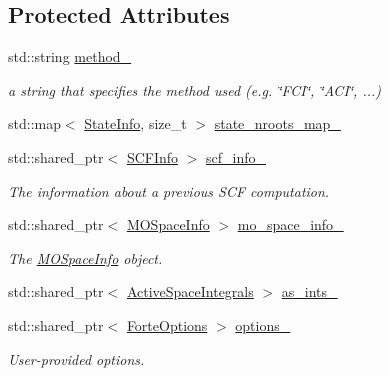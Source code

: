 \subsection*{Protected Attributes}
\begin{DoxyCompactItemize}
\item 
std\+::string \mbox{\hyperlink{classforte_1_1_active_space_solver_a7d69532c3bb03e0dc39a0b5b8c633544}{method\+\_\+}}
\begin{DoxyCompactList}\small\item\em a string that specifies the method used (e.\+g. \char`\"{}\+F\+C\+I\char`\"{}, \char`\"{}\+A\+C\+I\char`\"{}, ...) \end{DoxyCompactList}\item 
std\+::map$<$ \mbox{\hyperlink{classforte_1_1_state_info}{State\+Info}}, size\+\_\+t $>$ \mbox{\hyperlink{classforte_1_1_active_space_solver_ad97b0a6e07f38da9e7f32632bdec95bb}{state\+\_\+nroots\+\_\+map\+\_\+}}
\item 
std\+::shared\+\_\+ptr$<$ \mbox{\hyperlink{classforte_1_1_s_c_f_info}{S\+C\+F\+Info}} $>$ \mbox{\hyperlink{classforte_1_1_active_space_solver_a03edab09e020e472b311be5401d9ebad}{scf\+\_\+info\+\_\+}}
\begin{DoxyCompactList}\small\item\em The information about a previous S\+CF computation. \end{DoxyCompactList}\item 
std\+::shared\+\_\+ptr$<$ \mbox{\hyperlink{classforte_1_1_m_o_space_info}{M\+O\+Space\+Info}} $>$ \mbox{\hyperlink{classforte_1_1_active_space_solver_a32a700889f190e3114786cee58255f27}{mo\+\_\+space\+\_\+info\+\_\+}}
\begin{DoxyCompactList}\small\item\em The \mbox{\hyperlink{classforte_1_1_m_o_space_info}{M\+O\+Space\+Info}} object. \end{DoxyCompactList}\item 
std\+::shared\+\_\+ptr$<$ \mbox{\hyperlink{classforte_1_1_active_space_integrals}{Active\+Space\+Integrals}} $>$ \mbox{\hyperlink{classforte_1_1_active_space_solver_a0af4d2dcbe729958cc0526436534b61e}{as\+\_\+ints\+\_\+}}
\item 
std\+::shared\+\_\+ptr$<$ \mbox{\hyperlink{classforte_1_1_forte_options}{Forte\+Options}} $>$ \mbox{\hyperlink{classforte_1_1_active_space_solver_a2916126e2403a6955fa6f76f13285232}{options\+\_\+}}
\begin{DoxyCompactList}\small\item\em User-\/provided options. \end{DoxyCompactList}\item 

\end{DoxyCompactItemize}
